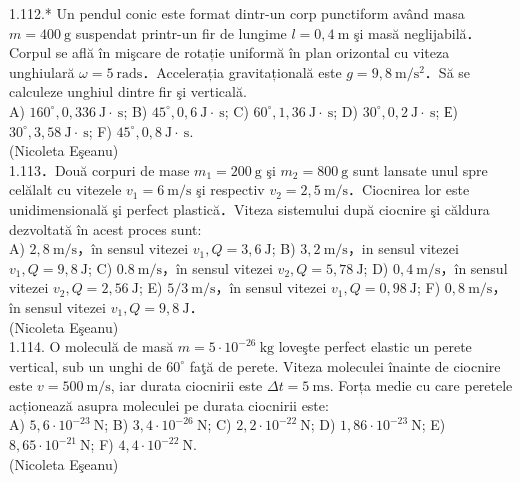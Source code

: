 1.112.* Un pendul conic este format dintr-un corp punctiform având masa $m=400 \mathrm{~g}$ suspendat printr-un fir de lungime $l=0,4 \mathrm{~m}$ şi masă neglijabilă．Corpul se află în mişcare de rotație uniformă în plan orizontal cu viteza unghiulară $\omega=5 \mathrm{~rads}$．Accelerația gravitațională este $g=9,8 \mathrm{~m} / \mathrm{s}^{2}$．Să se calculeze unghiul dintre fir şi verticală.\\ A) $160^{\circ}, 0,336 \mathrm{~J} \cdot \mathrm{~s}$; B) $45^{\circ}, 0,6 \mathrm{~J} \cdot \mathrm{~s}$; C) $60^{\circ}, 1,36 \mathrm{~J} \cdot \mathrm{~s}$; D) $30^{\circ}, 0,2 \mathrm{~J} \cdot \mathrm{~s}$; Е) $30^{\circ}, 3,58 \mathrm{~J} \cdot \mathrm{~s}$; F) $45^{\circ}, 0,8 \mathrm{~J} \cdot \mathrm{~s}$.\\ (Nicoleta Eşeanu)\\

1.113．Două corpuri de mase $m_{1}=200 \mathrm{~g}$ şi $m_{2}=800 \mathrm{~g}$ sunt lansate unul spre celălalt cu vitezele $v_{1}=6 \mathrm{~m} / \mathrm{s}$ şi respectiv $v_{2}=2,5 \mathrm{~m} / \mathrm{s}$．Ciocnirea lor este unidimensională şi perfect plastică．Viteza sistemului după ciocnire şi căldura dezvoltată în acest proces sunt:\\ A) $2,8 \mathrm{~m} / \mathrm{s}$，în sensul vitezei $v_{1}, Q=3,6 \mathrm{~J}$; B) $3,2 \mathrm{~m} / \mathrm{s}$，in sensul vitezei $v_{1}, Q=9,8 \mathrm{~J}$; C) $0.8 \mathrm{~m} / \mathrm{s}$，în sensul vitezei $v_{2}, Q=5,78 \mathrm{~J}$; D) $0,4 \mathrm{~m} / \mathrm{s}$，în sensul vitezei $v_{2}, Q=2,56 \mathrm{~J}$; E) $5 / 3 \mathrm{~m} / \mathrm{s}$，în sensul vitezei $v_{1}, Q=0,98 \mathrm{~J}$; F) $0,8 \mathrm{~m} / \mathrm{s}$，în sensul vitezei $v_{1}, Q=9,8 \mathrm{~J}$．\\ (Nicoleta Eşeanu)\\

1.114. O moleculă de masă $m=5 \cdot 10^{-26} \mathrm{~kg}$ loveşte perfect elastic un perete vertical, sub un unghi de $60^{\circ}$ faţă de perete. Viteza moleculei înainte de ciocnire este $v=500 \mathrm{~m} / \mathrm{s}$, iar durata ciocnirii este $\Delta t=5 \mathrm{~ms}$. Forța medie cu care peretele acționează asupra moleculei pe durata ciocnirii este:\\ A) $5,6 \cdot 10^{-23} \mathrm{~N}$; B) $3,4 \cdot 10^{-26} \mathrm{~N}$; C) $2,2 \cdot 10^{-22} \mathrm{~N}$; D) $1,86 \cdot 10^{-23} \mathrm{~N}$; E) $8,65 \cdot 10^{-21} \mathrm{~N}$; F) $4,4 \cdot 10^{-22} \mathrm{~N}$.\\ (Nicoleta Eşeanu)\\

